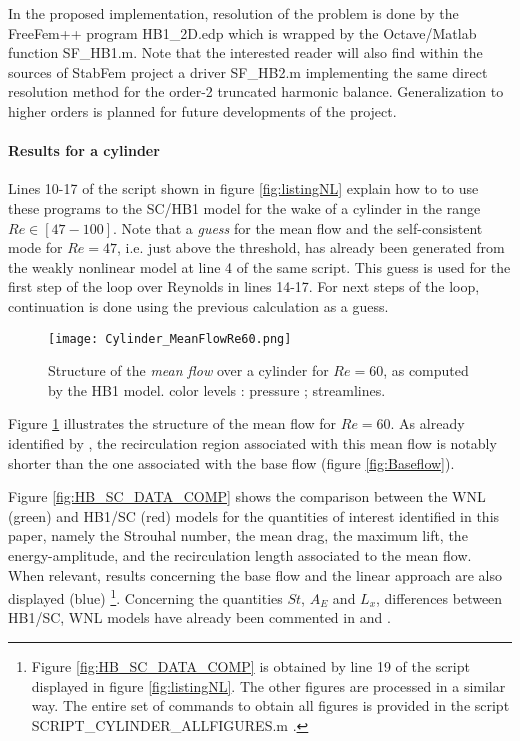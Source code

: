 \documentclass[twocolumn,10pt]{asme2ej}
\begin{document}
In the proposed implementation, resolution of the problem is done by the FreeFem++ program {\sf  HB1\_2D.edp} which is wrapped by the Octave/Matlab function {\sf  SF\_HB1.m}. Note that the interested reader will also find within the sources of StabFem project a driver {\sf  SF\_HB2.m} implementing the same direct resolution method for the order-2 truncated harmonic balance. Generalization to higher orders is planned for future developments of the project.
  
 \paragraph{Results for a cylinder}
 
Lines 10-17 of the script shown in figure \ref{fig:listingNL}  explain how to to use these programs to the SC/HB1 model for the wake of a cylinder in the range $Re \in [47-100] $. Note that a {\em guess} for the mean flow and the self-consistent mode for $Re = 47$, i.e. just above the threshold, has already been generated from the weakly nonlinear model at line 4 of the same script. This guess is used for the first step of the loop over Reynolds in lines 14-17. For next steps of the loop, continuation is done using the previous calculation as a guess. 

\begin{figure}
\begin{center}
\texttt{[image: Cylinder\_MeanFlowRe60.png]}
\end{center}
\caption{Structure of the {\em mean flow} over a cylinder for $Re = 60$, as computed by the HB1 model. color levels : pressure ; streamlines.}
\label{fig:MF60}
\end{figure}



Figure \ref{fig:MF60} illustrates the structure of the mean flow for $Re=60$. As already identified by  \cite{MLugo2014}, the recirculation region associated with this mean flow is notably shorter than the one associated with the base flow (figure \ref{fig:Baseflow}). 



Figure \ref{fig:HB_SC_DATA_COMP} shows the comparison between the WNL (green) and HB1/SC (red) models for the quantities of interest identified in this paper, namely the Strouhal number, the mean drag, the maximum lift, the energy-amplitude, and the recirculation length associated to the mean flow. When relevant, results concerning the base flow and the linear approach are also displayed (blue)
\footnote{Figure   \ref{fig:HB_SC_DATA_COMP} is obtained by line 19 of the script displayed in figure \ref{fig:listingNL}. The other figures are processed in a similar way. The entire set of commands to obtain all figures is provided in the script {\sf SCRIPT\_CYLINDER\_ALLFIGURES.m} .}.
Concerning the quantities $St$, $A_E$ and $L_x$, differences between HB1/SC, WNL models have already been commented in  \cite{MLugo2014} and \cite{FDR2016}. 
\end{document}
